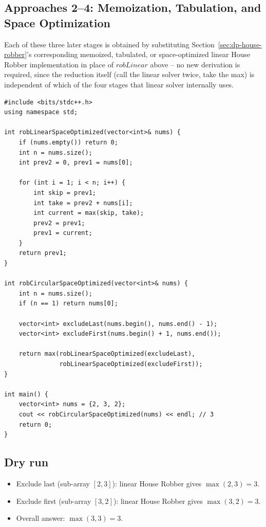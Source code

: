 \subsection*{Approaches 2--4: Memoization, Tabulation, and Space Optimization}

Each of these three later stages is obtained by substituting
Section~\ref{sec:dp-house-robber}'s corresponding memoized, tabulated, or
space-optimized linear House Robber implementation in place of
$\textit{robLinear}$ above -- no new derivation is required, since the
reduction itself (call the linear solver twice, take the max) is
independent of which of the four stages that linear solver internally
uses.

\begin{lstlisting}
#include <bits/stdc++.h>
using namespace std;

int robLinearSpaceOptimized(vector<int>& nums) {
    if (nums.empty()) return 0;
    int n = nums.size();
    int prev2 = 0, prev1 = nums[0];

    for (int i = 1; i < n; i++) {
        int skip = prev1;
        int take = prev2 + nums[i];
        int current = max(skip, take);
        prev2 = prev1;
        prev1 = current;
    }
    return prev1;
}

int robCircularSpaceOptimized(vector<int>& nums) {
    int n = nums.size();
    if (n == 1) return nums[0];

    vector<int> excludeLast(nums.begin(), nums.end() - 1);
    vector<int> excludeFirst(nums.begin() + 1, nums.end());

    return max(robLinearSpaceOptimized(excludeLast),
               robLinearSpaceOptimized(excludeFirst));
}

int main() {
    vector<int> nums = {2, 3, 2};
    cout << robCircularSpaceOptimized(nums) << endl; // 3
    return 0;
}
\end{lstlisting}

\subsection*{Dry run}


\begin{itemize}
  \item Exclude last (sub-array $[2,3]$): linear House Robber gives
        $\max(2,3)=3$.
  \item Exclude first (sub-array $[3,2]$): linear House Robber gives
        $\max(3,2)=3$.
  \item Overall answer: $\max(3,3)=3$.
\end{itemize}

